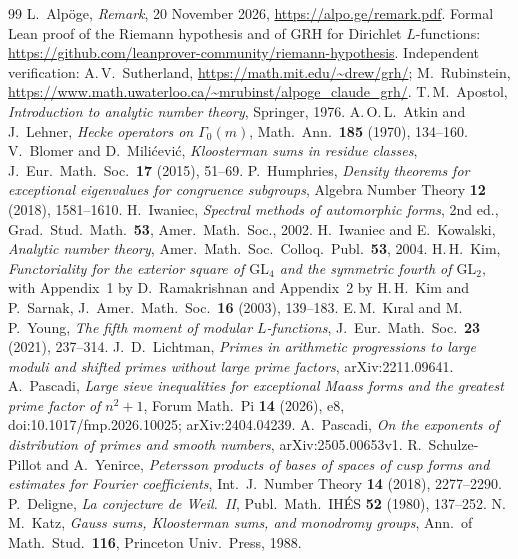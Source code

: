 \documentclass[11pt,colorlinks]{charlie}
\begin{document}
\begin{thebibliography}{99}
 L.~Alp\"oge, \emph{Remark}, 20 November 2026, \url{https://alpo.ge/remark.pdf}. Formal Lean proof of the Riemann hypothesis and of GRH for Dirichlet $L$-functions: \url{https://github.com/leanprover-community/riemann-hypothesis}. Independent verification: A.\,V.~Sutherland, \url{https://math.mit.edu/~drew/grh/}; M.~Rubinstein, \url{https://www.math.uwaterloo.ca/~mrubinst/alpoge_claude_grh/}.
 T.\,M.~Apostol, \emph{Introduction to analytic number theory}, Springer, 1976.
 A.\,O.\,L.~Atkin and J.~Lehner, \emph{Hecke operators on $\Gamma_0(m)$}, Math.\ Ann.\ \textbf{185} (1970), 134--160.
 V.~Blomer and D.~Mili\'cevi\'c, \emph{Kloosterman sums in residue classes}, J.\ Eur.\ Math.\ Soc.\ \textbf{17} (2015), 51--69.
 P.~Humphries, \emph{Density theorems for exceptional eigenvalues for congruence subgroups}, Algebra Number Theory \textbf{12} (2018), 1581--1610.
 H.~Iwaniec, \emph{Spectral methods of automorphic forms}, 2nd ed., Grad.\ Stud.\ Math.\ \textbf{53}, Amer.\ Math.\ Soc., 2002.
 H.~Iwaniec and E.~Kowalski, \emph{Analytic number theory}, Amer.\ Math.\ Soc.\ Colloq.\ Publ.\ \textbf{53}, 2004.
 H.\,H.~Kim, \emph{Functoriality for the exterior square of $\mathrm{GL}_4$ and the symmetric fourth of $\mathrm{GL}_2$}, with Appendix~1 by D.~Ramakrishnan and Appendix~2 by H.\,H.~Kim and P.~Sarnak, J.\ Amer.\ Math.\ Soc.\ \textbf{16} (2003), 139--183.
 E.\,M.~K\i ral and M.\,P.~Young, \emph{The fifth moment of modular $L$-functions}, J.\ Eur.\ Math.\ Soc.\ \textbf{23} (2021), 237--314.
 J.~D.~Lichtman, \emph{Primes in arithmetic progressions to large moduli and shifted primes without large prime factors}, arXiv:2211.09641.
 A.~Pascadi, \emph{Large sieve inequalities for exceptional Maass forms and the greatest prime factor of $n^2+1$}, Forum Math.\ Pi \textbf{14} (2026), e8, doi:10.1017/fmp.2026.10025; arXiv:2404.04239.
 A.~Pascadi, \emph{On the exponents of distribution of primes and smooth numbers}, arXiv:2505.00653v1.
 R.~Schulze-Pillot and A.~Yenirce, \emph{Petersson products of bases of spaces of cusp forms and estimates for Fourier coefficients}, Int.\ J.\ Number Theory \textbf{14} (2018), 2277--2290.
 P.~Deligne, \emph{La conjecture de Weil.~II}, Publ.\ Math.\ IH\'ES \textbf{52} (1980), 137--252.
 N.\,M.~Katz, \emph{Gauss sums, Kloosterman sums, and monodromy groups}, Ann.\ of Math.\ Stud.\ \textbf{116}, Princeton Univ.\ Press, 1988.

\end{thebibliography}
\end{document}
